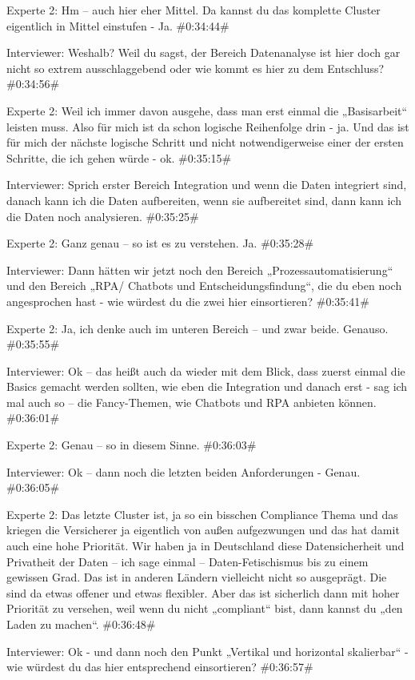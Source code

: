 Experte 2:
Hm – auch hier eher Mittel. Da kannst du das komplette Cluster eigentlich in Mittel einstufen - Ja.
\#0:34:44\#

Interviewer:
Weshalb? Weil du sagst, der Bereich Datenanalyse ist hier doch gar nicht so extrem ausschlaggebend oder wie kommt es hier zu dem Entschluss?
\#0:34:56\#

Experte 2:
Weil ich immer davon ausgehe, dass man erst einmal die „Basisarbeit“ leisten muss. Also für mich ist da schon logische Reihenfolge drin - ja. Und das ist für mich der nächste logische Schritt und nicht notwendigerweise einer der ersten Schritte, die ich gehen würde - ok.
\#0:35:15\#

Interviewer:
Sprich erster Bereich Integration und wenn die Daten integriert sind, danach kann ich die Daten aufbereiten, wenn sie aufbereitet sind, dann kann ich die Daten noch analysieren.
\#0:35:25\#

Experte 2:
Ganz genau – so ist es zu verstehen. Ja.
\#0:35:28\#

Interviewer:
Dann hätten wir jetzt noch den Bereich „Prozessautomatisierung“ und den Bereich „RPA/ Chatbots und Entscheidungsfindung“, die du eben noch angesprochen hast - wie würdest du die zwei hier einsortieren?
\#0:35:41\#

Experte 2:
Ja, ich denke auch im unteren Bereich – und zwar beide. Genauso.
\#0:35:55\#

Interviewer:
Ok – das heißt auch da wieder mit dem Blick, dass zuerst einmal die Basics gemacht werden sollten, wie eben die Integration und danach erst - sag ich mal auch so – die Fancy-Themen, wie Chatbots und RPA anbieten können.
\#0:36:01\#

Experte 2:
Genau – so in diesem Sinne.
\#0:36:03\#

Interviewer:
Ok – dann noch die letzten beiden Anforderungen - Genau.
\#0:36:05\#

Experte 2:
Das letzte Cluster ist, ja so ein bisschen Compliance Thema und das kriegen die Versicherer ja eigentlich von außen aufgezwungen und das hat damit auch eine hohe Priorität. Wir haben ja in Deutschland diese Datensicherheit und Privatheit der Daten – ich sage einmal – Daten-Fetischismus bis zu einem gewissen Grad. Das ist in anderen Ländern vielleicht nicht so ausgeprägt. Die sind da etwas offener und etwas flexibler. Aber das ist sicherlich dann mit hoher Priorität zu versehen, weil wenn du nicht „compliant“ bist, dann kannst du „den Laden zu machen“.
\#0:36:48\#

Interviewer:
Ok - und dann noch den Punkt „Vertikal und horizontal skalierbar“ - wie würdest du das hier entsprechend einsortieren?
\#0:36:57\#

